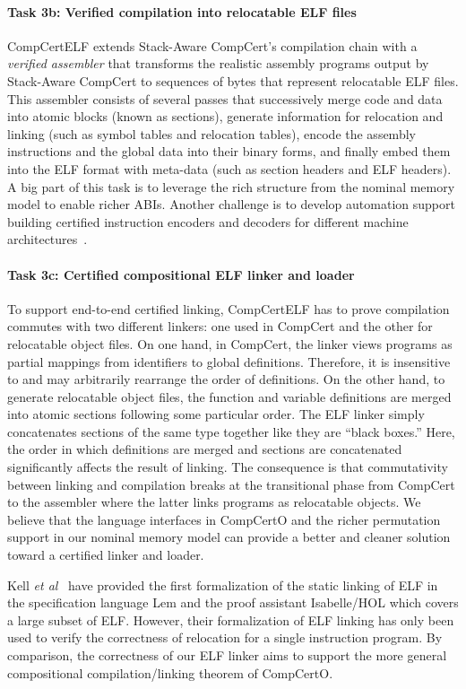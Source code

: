 \vspace*{-2ex}
\paragraph*{Task 3b: Verified compilation into relocatable ELF files}
CompCertELF %
extends Stack-Aware CompCert's compilation chain with a
\emph{verified assembler} that transforms the realistic assembly
programs output by Stack-Aware CompCert to sequences of bytes that
represent relocatable ELF files.  This assembler consists of several
passes that successively merge code and data into atomic blocks (known
as sections), generate information for relocation and linking (such as
symbol tables and relocation tables), encode the assembly instructions
and the global data into their binary forms, and finally embed them
into the ELF format with meta-data (such as section headers and ELF
headers). A big part of this task is to leverage the rich structure
from the nominal memory model to enable richer ABIs.  Another
challenge is to develop automation support building certified
instruction encoders and decoders for different machine
architectures~\cite{xu21}.

\vspace*{-2ex}
\paragraph*{Task 3c: Certified compositional ELF linker and loader}
To support end-to-end certified linking, CompCertELF has to prove
compilation commutes with two different linkers: one used in CompCert
and the other for relocatable object files. On one hand, in CompCert,
the linker views programs as partial mappings from identifiers to
global definitions. Therefore, it is insensitive to and may
arbitrarily rearrange the order of definitions. On the other hand, to
generate relocatable object files, the function and variable
definitions are merged into atomic sections following some particular
order. The ELF linker simply concatenates sections of the same type
together like they are ``black boxes.''  Here, the order in which
definitions are merged and sections are concatenated significantly
affects the result of linking.  The consequence is that commutativity
between linking and compilation breaks at the transitional phase from
CompCert to the assembler where the latter links programs as
relocatable objects. We believe that the language interfaces in
CompCertO and the richer permutation support in our nominal memory
model can provide a better and cleaner solution toward a certified
linker and loader.

Kell {\em et al}~\cite{kell2016} have provided the first formalization
of the static linking of ELF in the specification language Lem and the
proof assistant Isabelle/HOL which covers a large subset of
ELF. However, their formalization of ELF linking has only been used to
verify the correctness of relocation for a single instruction
program. By comparison, the correctness of our ELF linker aims to
support the more general compositional compilation/linking theorem of
CompCertO.

